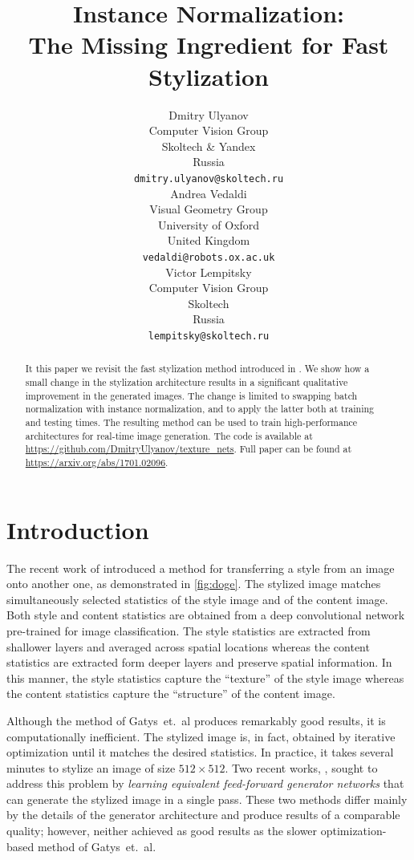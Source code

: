 \documentclass{article}
\title{Instance Normalization:\\ The Missing Ingredient for Fast Stylization}
\author{
  Dmitry Ulyanov \\
  Computer Vision Group \\
  Skoltech \& Yandex \\  
  Russia \\
  \texttt{dmitry.ulyanov@skoltech.ru} \\
  \And
  Andrea Vedaldi \\
  Visual Geometry Group \\ 
  University of Oxford \\ 
  United Kingdom \\
  \texttt{vedaldi@robots.ox.ac.uk} \\
   \AND
  Victor Lempitsky \\
  Computer Vision Group \\
  Skoltech \\  
  Russia \\
  \texttt{lempitsky@skoltech.ru} \\
}
\begin{document}
\maketitle
\begin{abstract}
It this paper we revisit the fast stylization method introduced in \cite{DBLP:conf/icml/UlyanovLVL16}. We show how a small change in the stylization architecture results in a significant qualitative improvement in the generated images. The change is limited to swapping batch normalization with instance normalization, and to apply the latter both at training and testing times. The resulting method can be used to train high-performance architectures for real-time image generation. The code is available at \url{https://github.com/DmitryUlyanov/texture_nets}. Full paper can be found at \url{https://arxiv.org/abs/1701.02096}.
\end{abstract}

\section{Introduction}\label{s:intro}

The recent work of \cite{Gatys_2016_CVPR} introduced a method for transferring a style from an image onto another one, as demonstrated in \cref{fig:doge}. The stylized image matches simultaneously selected statistics of the style image and of the content image. Both style and content statistics are obtained from a deep convolutional network pre-trained for image classification. The style statistics are extracted from shallower layers and averaged across spatial locations whereas the content statistics are extracted form deeper layers and preserve spatial information. In this manner, the style statistics capture the ``texture'' of the style image whereas the content statistics capture the ``structure'' of the content image.

Although the method of  Gatys~et.~al produces remarkably good results, it is computationally inefficient. The stylized image is, in fact, obtained by iterative optimization until it matches the desired statistics. In practice, it takes several minutes to stylize an image of size $512\times 512$. Two recent works, \cite{DBLP:conf/icml/UlyanovLVL16} \cite{DBLP:journals/corr/JohnsonAL16}, sought to address this problem by \emph{learning equivalent feed-forward generator networks} that can generate the stylized image in a single pass. These two methods differ mainly by the details of the generator architecture and produce results of a comparable quality; however, neither achieved as good results as the slower optimization-based method of Gatys~et.~al.
\end{document}
